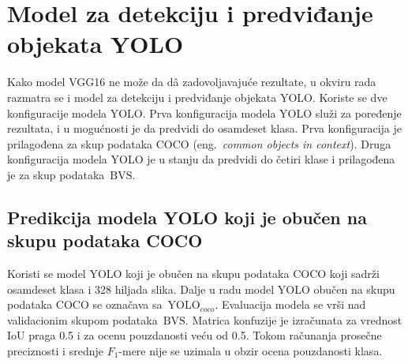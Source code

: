 \documentclass[12pt,oneside]{memoir}
\newcommand{\yolo}{\ensuremath{\,\textrm{YOLO}}}
\newcommand{\bvs}{\ensuremath{\,\textrm{BVS}}}
\begin{document}
\section{Model za detekciju i predviđanje objekata YOLO}

Kako model VGG16 ne može da d\^{a} zadovoljavajuće rezultate, u okviru rada razmatra se i model za detekciju i predviđanje objekata YOLO. Koriste se dve konfiguracije modela YOLO. Prva konfiguracija modela YOLO služi za poređenje rezultata, i u mogućnosti je da predvidi do osamdeset klasa. Prva konfiguracija je prilagođena za skup podataka COCO (eng.~\textit{common objects in context}). Druga konfiguracija modela YOLO je u stanju da predvidi do četiri klase i prilagođena je za skup podataka \bvs.


\subsection{Predikcija modela YOLO koji je obučen na skupu podataka COCO}

Koristi se model YOLO koji je obučen na skupu podataka COCO koji sadrži osamdeset klasa i 328 hiljada slika. Dalje u radu model YOLO obučen na skupu podataka COCO se označava sa $\yolo_{coco}$. Evaluacija modela se vrši nad validacionim skupom podataka \bvs. Matrica konfuzije je izračunata za vrednost IoU praga 0.5 i za ocenu pouzdanosti veću od 0.5. Tokom računanja prosečne preciznosti i srednje $F_1$-mere nije se uzimala u obzir ocena pouzdanosti klasa. 
\end{document}

